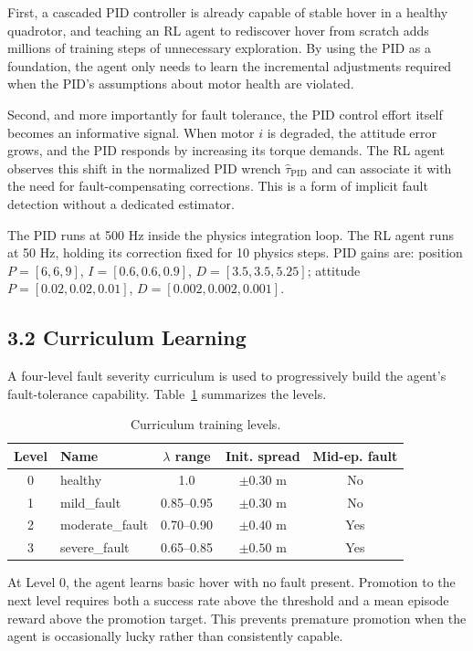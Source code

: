\documentclass[12pt,letterpaper]{article}
\begin{document}
First, a cascaded PID controller is already capable of stable hover in a healthy quadrotor, and teaching an RL agent to rediscover hover from scratch adds millions of training steps of unnecessary exploration. By using the PID as a foundation, the agent only needs to learn the incremental adjustments required when the PID's assumptions about motor health are violated.

Second, and more importantly for fault tolerance, the PID control effort itself becomes an informative signal. When motor $i$ is degraded, the attitude error grows, and the PID responds by increasing its torque demands. The RL agent observes this shift in the normalized PID wrench $\hat{\tau}_{\text{PID}}$ and can associate it with the need for fault-compensating corrections. This is a form of implicit fault detection without a dedicated estimator.

The PID runs at 500 Hz inside the physics integration loop. The RL agent runs at 50 Hz, holding its correction fixed for 10 physics steps. PID gains are: position $P = [6, 6, 9]$, $I = [0.6, 0.6, 0.9]$, $D = [3.5, 3.5, 5.25]$; attitude $P = [0.02, 0.02, 0.01]$, $D = [0.002, 0.002, 0.001]$.

\subsection*{3.2 Curriculum Learning}

A four-level fault severity curriculum is used to progressively build the agent's fault-tolerance capability. Table~\ref{tab:curriculum} summarizes the levels.

\begin{table}[h]
\centering
\caption{Curriculum training levels.}
\label{tab:curriculum}
\begin{tabular}{clccc}
\toprule
Level & Name & $\lambda$ range & Init. spread & Mid-ep. fault \\
\midrule
0 & healthy      & 1.0           & $\pm 0.30$ m & No \\
1 & mild\_fault  & 0.85--0.95    & $\pm 0.30$ m & No \\
2 & moderate\_fault & 0.70--0.90 & $\pm 0.40$ m & Yes \\
3 & severe\_fault   & 0.65--0.85 & $\pm 0.50$ m & Yes \\
\bottomrule
\end{tabular}
\end{table}

At Level 0, the agent learns basic hover with no fault present. Promotion to the next level requires both a success rate above the threshold and a mean episode reward above the promotion target. This prevents premature promotion when the agent is occasionally lucky rather than consistently capable.
\end{document}
